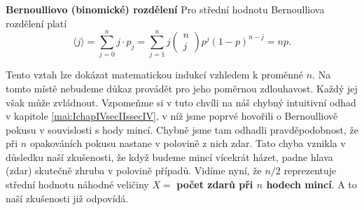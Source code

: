 \begin{mdframed}[style=mdexam]
  \begin{example}\label{mai:exam066}
    \textbf{Bernoulliovo (binomické) rozdělení}\newline
    Pro střední hodnotu Bernoulliova rozdělení platí
    \begin{equation*}
      \langle j \rangle = \sum_{j=0}^{n}j\cdot p_j
        = \sum_{j=1}^{n}j\begin{pmatrix} n \\ j \end{pmatrix}p^j(1-p)^{n-j} = np.
    \end{equation*}
    
    Tento vztah lze dokázat matematickou indukcí vzhledem k proměnné \(n\). Na tomto místě nebudeme
    důkaz provádět pro jeho poměrnou zdlouhavost. Každý jej však může zvládnout. Vzpomeňme si v tuto
    chvíli na náš chybný intuitivní odhad v kapitole \ref{mai:IchapIVsecIIssecIV}, v níž jsme
    poprvé hovořili o Bernoulliově pokusu v souvislosti s hody mincí. Chybně jsme tam odhadli
    pravděpodobnost, že při \(n\) opakováních pokusu nastane v polovině z nich zdar. Tato chyba
    vznikla v důsledku naší zkušenosti, že když budeme mincí vícekrát házet, padne hlava (zdar)
    skutečně zhruba v polovině případů. Vidíme nyní, že \(n/2\) reprezentuje střední hodnotu náhodné
    veličiny \(X =\) \textbf{počet zdarů při \(n\) hodech mincí}. A to naší zkušenosti již odpovídá.
  \end{example}
\end{mdframed}